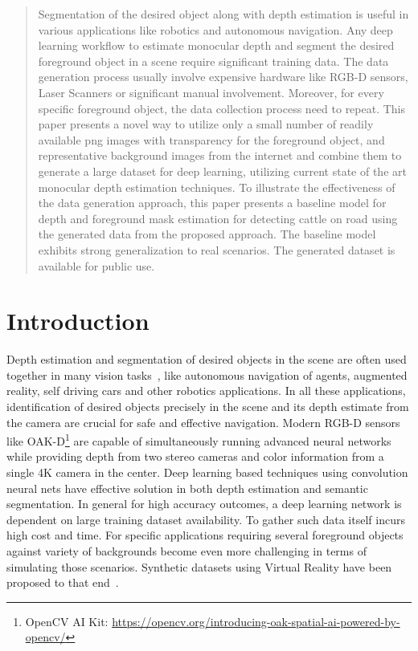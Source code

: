 \documentclass[review]{cvpr}
\begin{document}
\begin{abstract}
  Segmentation of the desired object along with depth estimation is useful in various applications like robotics and autonomous navigation. Any deep learning workflow to estimate monocular depth and segment the desired foreground object in a scene require significant training data. The data generation process usually involve expensive hardware like RGB-D sensors, Laser Scanners or significant manual involvement. Moreover, for every specific foreground object, the data collection process need to repeat. This paper presents a novel way to utilize only a small number of readily available png images with transparency for the foreground object, and representative background images from the internet and combine them to generate a large dataset for deep learning, utilizing current state of the art monocular depth estimation techniques. To illustrate the effectiveness of the data generation approach, this paper presents a baseline model for depth and foreground mask estimation for detecting cattle on road using the generated data from the proposed approach. The baseline model exhibits strong generalization to real scenarios. The generated dataset is available for public use.
\end{abstract}

 

\section{Introduction}
Depth estimation and segmentation of desired objects in the scene are often used together in many vision tasks~\cite{lin2018joint}, like autonomous navigation of agents, augmented reality, self driving cars and other robotics applications. In all these applications, identification of desired objects precisely in the scene and its depth estimate from the camera are crucial for safe and effective navigation. Modern RGB-D sensors like OAK-D\footnote{OpenCV AI Kit: \url{https://opencv.org/introducing-oak-spatial-ai-powered-by-opencv/}} are capable of simultaneously running advanced neural networks while providing depth from two stereo cameras and color information from a single 4K camera in the center. Deep learning based techniques using convolution neural nets have effective solution in both depth estimation and semantic segmentation. In general for high accuracy outcomes, a deep learning network is dependent on large training dataset availability. To gather such data itself incurs high cost and time. For specific applications requiring several foreground objects against variety of backgrounds become even more challenging in terms of simulating those scenarios. Synthetic datasets using Virtual Reality have been proposed to that end~\cite{ros2016synthia}.
\end{document}
